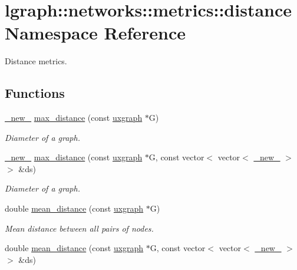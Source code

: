 \hypertarget{namespacelgraph_1_1networks_1_1metrics_1_1distance}{}\section{lgraph\+:\+:networks\+:\+:metrics\+:\+:distance Namespace Reference}
\label{namespacelgraph_1_1networks_1_1metrics_1_1distance}


Distance metrics.  


\subsection*{Functions}
\begin{DoxyCompactItemize}
\item 
\hyperlink{namespacelgraph_1_1utils_a2c84bfde888c42ab3ad6b2cb8a364240}{\+\_\+new\+\_\+} \hyperlink{namespacelgraph_1_1networks_1_1metrics_1_1distance_aece06d66c458437b25854dc04f317a9b}{max\+\_\+distance} (const \hyperlink{classlgraph_1_1utils_1_1uxgraph}{uxgraph} $\ast$G)
\begin{DoxyCompactList}\small\item\em Diameter of a graph. \end{DoxyCompactList}\item 
\hyperlink{namespacelgraph_1_1utils_a2c84bfde888c42ab3ad6b2cb8a364240}{\+\_\+new\+\_\+} \hyperlink{namespacelgraph_1_1networks_1_1metrics_1_1distance_afdde789d7bda4a4e1167f0cf1016be7f}{max\+\_\+distance} (const \hyperlink{classlgraph_1_1utils_1_1uxgraph}{uxgraph} $\ast$G, const vector$<$ vector$<$ \hyperlink{namespacelgraph_1_1utils_a2c84bfde888c42ab3ad6b2cb8a364240}{\+\_\+new\+\_\+} $>$ $>$ \&ds)
\begin{DoxyCompactList}\small\item\em Diameter of a graph. \end{DoxyCompactList}\item 
double \hyperlink{namespacelgraph_1_1networks_1_1metrics_1_1distance_ae0989fe3a9841ab45e373f00e4c7f4e0}{mean\+\_\+distance} (const \hyperlink{classlgraph_1_1utils_1_1uxgraph}{uxgraph} $\ast$G)
\begin{DoxyCompactList}\small\item\em Mean distance between all pairs of nodes. \end{DoxyCompactList}\item 
double \hyperlink{namespacelgraph_1_1networks_1_1metrics_1_1distance_a610a86fee1f1ccb7d3d469ea3b561dac}{mean\+\_\+distance} (const \hyperlink{classlgraph_1_1utils_1_1uxgraph}{uxgraph} $\ast$G, const vector$<$ vector$<$ \hyperlink{namespacelgraph_1_1utils_a2c84bfde888c42ab3ad6b2cb8a364240}{\+\_\+new\+\_\+} $>$ $>$ \&ds)

\end{DoxyCompactItemize}
